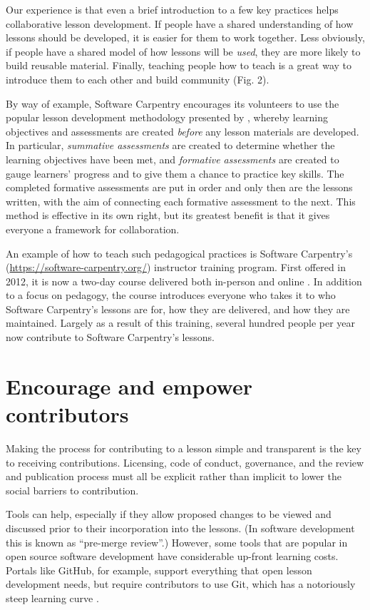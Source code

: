 \documentclass[10pt,letterpaper]{article}
\newcommand{\rulemajor}[2]{\section{#1}\label{#2}}
\begin{document}
Our experience is that even a brief introduction to a few key practices
helps collaborative lesson development.
If people have a shared understanding of how lessons should be developed,
it is easier for them to work together.
Less obviously,
if people have a shared model of how lessons will be \emph{used},
they are more likely to build reusable material.
Finally,
teaching people how to teach is a great way to introduce them to each other and build community (Fig. 2).

By way of example, Software Carpentry encourages its volunteers to use
the popular lesson development methodology presented by \cite{wiggins-mctighe},
whereby learning objectives and assessments are created \emph{before} any lesson materials are developed.
In particular, \emph{summative assessments} are created to determine whether the learning objectives have been met,
and \emph{formative assessments} are created to gauge learners' progress and to give them a chance to practice key skills.
The completed formative assessments are put in order and only then are the lessons written, 
with the aim of connecting each formative assessment to the next.
This method is effective in its own right,
but its greatest benefit is that it gives everyone a framework for collaboration.

An example of how to teach such pedagogical practices
is Software Carpentry's (\url{https://software-carpentry.org/}) instructor training program.
First offered in 2012,
it is now a two-day course delivered both in-person and online
\cite{lessons-learned,instructor-training,how-to-teach-programming}.
In addition to a focus on pedagogy,
the course introduces everyone who takes it to who Software Carpentry's lessons are for,
how they are delivered,
and how they are maintained.
Largely as a result of this training,
several hundred people per year now contribute to Software Carpentry's lessons.

\rulemajor{Encourage and empower contributors}{empower}

Making the process for contributing to a lesson simple and transparent
is the key to receiving contributions.
Licensing, code of conduct, governance, and the review and publication process
must all be explicit rather than implicit
to lower the social barriers to contribution.

Tools can help,
especially if they allow proposed changes to be viewed and discussed
prior to their incorporation into the lessons.
(In software development this is known as ``pre-merge review''.)
However,
some tools that are popular in open source software development have considerable up-front learning costs.
Portals like GitHub,
for example,
support everything that open lesson development needs,
but require contributors to use Git,
which has a notoriously steep learning curve \cite{git-survey}.
\end{document}
